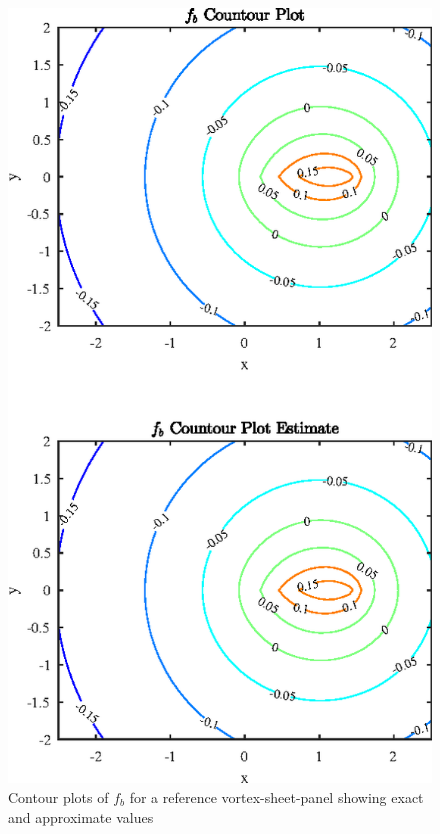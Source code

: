 \begin{figure}[H]
\centering
\includegraphics[scale=1.55]{graphs/e2g2.eps}
\caption{Contour plots of $f_b$ for a reference vortex-sheet-panel showing exact and approximate values}
\label{e2g2}
\end{figure}